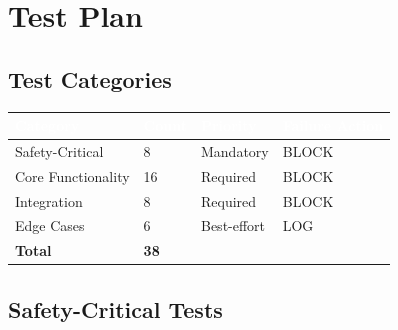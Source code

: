 \documentclass[11pt,letterpaper]{article}
\newcommand{\tableheader}[1]{\textbf{\sffamily\textcolor{white}{#1}}}
\begin{document}
\section{Test Plan}

\subsection{Test Categories}

\begin{center}
\begin{tabularx}{\textwidth}{L{3cm}C{1.5cm}C{1.5cm}X}
\toprule
{}
\tableheader{Category} & \tableheader{Count} & \tableheader{Priority} & \tableheader{Failure Action} \\
\midrule
Safety-Critical & 8 & Mandatory & BLOCK \\
Core Functionality & 16 & Required & BLOCK \\
Integration & 8 & Required & BLOCK \\
Edge Cases & 6 & Best-effort & LOG \\
\midrule
\textbf{Total} & \textbf{38} & & \\
\bottomrule
\end{tabularx}
\end{center}

\subsection{Safety-Critical Tests}
\end{document}
